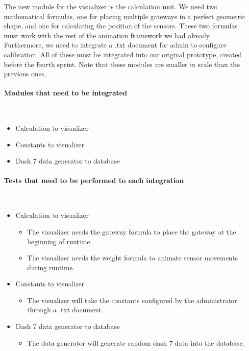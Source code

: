 \documentclass[../document]{subfiles}
\begin{document}
The new module for the visualizer is the calculation unit. We need two mathematical formulas, one for placing multiple gateways in a perfect geometric shape, and one for calculating the position of the sensors. These two formulas must work with the rest of the animation framework we had already. Furthermore, we need to integrate a .txt document for admin to configure calibration. All of these must be integrated into our original prototype, created before the fourth sprint. Note that these modules are smaller in scale than the previous ones.

\paragraph{Modules that need to be integrated} \ \\
\begin{itemize}
	\item
	Calculation to visualizer
	\item
	Constants to visualizer
	\item
	Dash 7 data generator to database
\end{itemize}

\paragraph{Tests that need to be performed to each integration} \ \\
\begin{itemize}
	\item
	Calculation to visualizer
	\begin{itemize}
		\item
		The visualizer needs the gateway formula to place the gateway at the beginning of runtime.
		\item
		The visualizer needs the weight formula to animate sensor movements during runtime.
	\end{itemize}
	\item
	Constants to visualizer
	\begin{itemize}
		\item
		The visualizer will take the constants configured by the administrator through a .txt document.
	\end{itemize}
	\item
	Dash 7 data generator to database
	\begin{itemize}
		\item
		The data generator will generate random dash 7 data into the database.
	\end{itemize}
\end{itemize}
\end{document}
